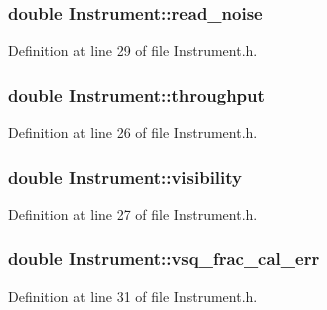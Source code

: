 \hypertarget{classInstrument_accb5f463e89c0c73d4c0e5b6b80397af}{
\subsubsection[{read\_\-noise}]{\setlength{\rightskip}{0pt plus 5cm}double {\bf Instrument::read\_\-noise}}}
\label{classInstrument_accb5f463e89c0c73d4c0e5b6b80397af}


Definition at line 29 of file Instrument.h.

\hypertarget{classInstrument_a24c5a78025ce2474443eb34b8828df08}{
\subsubsection[{throughput}]{\setlength{\rightskip}{0pt plus 5cm}double {\bf Instrument::throughput}}}
\label{classInstrument_a24c5a78025ce2474443eb34b8828df08}


Definition at line 26 of file Instrument.h.

\hypertarget{classInstrument_a8a79a07bd650ab75118beff9f46886a6}{
\subsubsection[{visibility}]{\setlength{\rightskip}{0pt plus 5cm}double {\bf Instrument::visibility}}}
\label{classInstrument_a8a79a07bd650ab75118beff9f46886a6}


Definition at line 27 of file Instrument.h.

\hypertarget{classInstrument_ad51820f02768c7632da7d9136ace806f}{
\subsubsection[{vsq\_\-frac\_\-cal\_\-err}]{\setlength{\rightskip}{0pt plus 5cm}double {\bf Instrument::vsq\_\-frac\_\-cal\_\-err}}}
\label{classInstrument_ad51820f02768c7632da7d9136ace806f}


Definition at line 31 of file Instrument.h.

